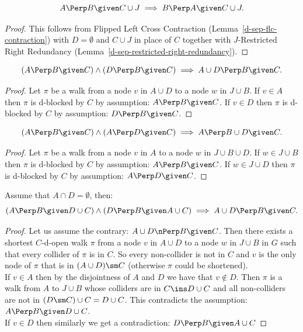 \begin{Lem}
    \[A \Perp  B \given C \cup J \implies B \Perp A \given C \cup J.\]
\begin{proof}
  This follows from Flipped Left Cross Contraction (Lemma~\ref{d-sep-flc-contraction}) with $D=\emptyset$ and $C \cup J$ in place of $C$ together with
    $J$-Restricted Right Redundancy (Lemma~\ref{d-sep-restricted-right-redundancy}).
\end{proof}
\end{Lem}


\begin{Lem}
    \[ (A \Perp  B \given  C) \land (D \Perp  B \given C) \implies A \cup D \Perp  B \given C.\]
\begin{proof}
    Let $\pi$ be a walk from a node $v$ in $A \cup D$ to a node $w$ in $J \cup B$.
    If $v \in A$ then $\pi$ is d-blocked by $C$ by assumption: $A \Perp  B \given  C$.
    If $v \in D$ then $\pi$ is d-blocked by $C$ by assumption: $D \Perp  B \given  C$.
\end{proof}
\end{Lem}

\begin{Lem}
    \[ (A \Perp  B \given  C) \land (A \Perp  D \given C) \implies A \Perp  B \cup  D \given C.\]
\begin{proof}
    Let $\pi$ be a walk from a node $v$ in $A$ to a node $w$ in  $J \cup B \cup D$.
    If $w \in J \cup B$ then $\pi$ is d-blocked by $C$ by assumption: $A \Perp  B \given  C$.
    If $w \in J \cup D$ then $\pi$ is d-blocked by $C$ by assumption: $A \Perp  D \given  C$.
\end{proof}
\end{Lem}

\begin{Lem} Assume that $A \cap D = \emptyset$, then:
    \[ (A \Perp  B \given D \cup  C) \land (D \Perp  B \given A \cup C) \implies A \cup D \Perp  B \given   C.\]
\begin{proof}
    Let us assume the contrary:  $A \cup D \nPerp  B \given C$.
    Then there exists a shortest $C$-d-open walk $\pi$ 
    from a node $v$ in $A \cup D$ to a node $w$ in $J \cup B $ in $G$ such that every collider of $\pi$ is in $C$.
    So every non-collider is not in $C$ and $v$ is 
    the only node of $\pi$ that is in $(A \cup D)\sm C$ (otherwise $\pi$ could be shortened). \\
    If $v \in A$ then by the disjointness of $A$ and $D$ we have that $v \notin D$. 
    Then $\pi$ is a walk from $A$ to $J \cup B$ whose colliders are in $C \ins D \cup C$ 
    and all non-colliders are not in $(D \sm C) \cup C =D \cup C$. This contradicts the assumption: $A \Perp  B \given D \cup  C$.\\
    If $v \in D$ then similarly we get a contradiction: $D \Perp  B \given A \cup  C$
\end{proof}
\end{Lem}

